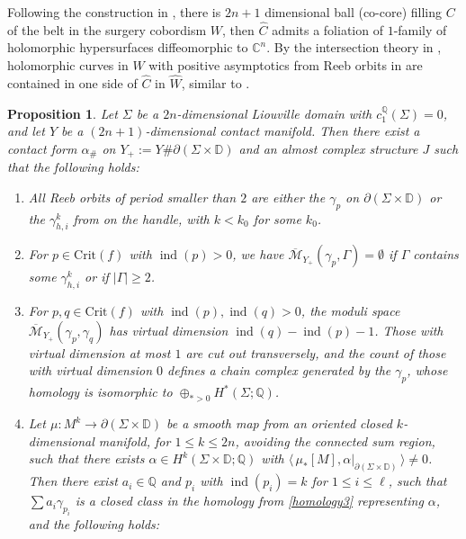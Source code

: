 \documentclass[11pt]{amsart}
\numberwithin{equation}{section}
\newtheorem{proposition}[theorem]{\textbf{Proposition}}
\def\C{{\mathbb C}}
\def\D{{\mathbb D}}
\def\Q{{\mathbb Q}}
\def\cM{{\mathcal M}}
\def\la{\langle\,}
\def\ra{\,\rangle}
\DeclareMathOperator{\ind}{ind}
\begin{document}
Following the construction in \cite{connected_sum}, there is $2n+1$ dimensional ball (co-core) filling $C$ of the belt in the surgery cobordism $W$, then $\widehat{C}$ admits a foliation of $1$-family of holomorphic hypersurfaces diffeomorphic to $\C^n$. By the intersection theory in \cite{arXiv:2506.06807}, holomorphic curves in $\widehat{W}$ with positive asymptotics from Reeb orbits in  are contained in one side of $\widehat{C}$ in $\widehat{W}$, similar to .

\begin{proposition}\label{prop:curve}
    Let $\Sigma$ be a $2n$-dimensional Liouville domain with $c_1^{\Q}(\Sigma)=0$, and let $Y$ be a $(2n+1)$-dimensional contact manifold. Then there exist a contact form $\alpha_\#$ on $Y_+:=Y\#\partial(\Sigma \times \D)$ and an almost complex structure $J$ such that the following holds:
    \begin{enumerate}
        \item\label{homology1} All Reeb orbits of period smaller than $2$ are either the $\gamma_{p}$ on $\partial(\Sigma\times \D)$ or the $\gamma^k_{h,i}$ from  on the handle, with $k<k_0$ for some $k_0$. 
        \item\label{homology2} For $p\in \mathrm{Crit}(f)$ with $\ind(p)>0$, we have $\overline{\cM}_{Y_+}(\gamma_p,\Gamma)=\emptyset$ if $\Gamma$ contains some $\gamma^k_{h,i}$ or if $|\Gamma|\ge 2$. 
        \item\label{homology3} For $p,q\in \mathrm{Crit}(f)$ with $\ind(p),\ind(q)>0$, the moduli space $\overline{\cM}_{Y_+}(\gamma_p,\gamma_q)$ has virtual dimension $\ind(q)-\ind(p)-1$. Those with virtual dimension at most $1$ are cut out transversely, and the count of those with virtual dimension $0$ defines a chain complex generated by the $\gamma_p$, whose homology is isomorphic to $\oplus_{*>0}H^*(\Sigma;\Q)$.
        \item\label{homology4} Let $\mu:M^k\to \partial(\Sigma \times \D)$ be a smooth map from an oriented closed $k$-dimensional manifold, for $1\le k \le 2n$, avoiding the connected sum region, such that there exists $\alpha \in H^k(\Sigma \times \D;\Q)$ with $\la \mu_*[M], \alpha|_{\partial (\Sigma \times \D)}\ra\ne 0$. Then there exist $a_i\in \Q$ and $p_i$ with $\ind(p_i)= k$ for $1\le i \le \ell$, such that $\sum a_i\gamma_{p_i}$ is a closed class in the homology from \eqref{homology3} representing $\alpha$, and the following holds:
        \begin{enumerate}

\end{enumerate}
\end{enumerate}
\end{proposition}
\end{document}
